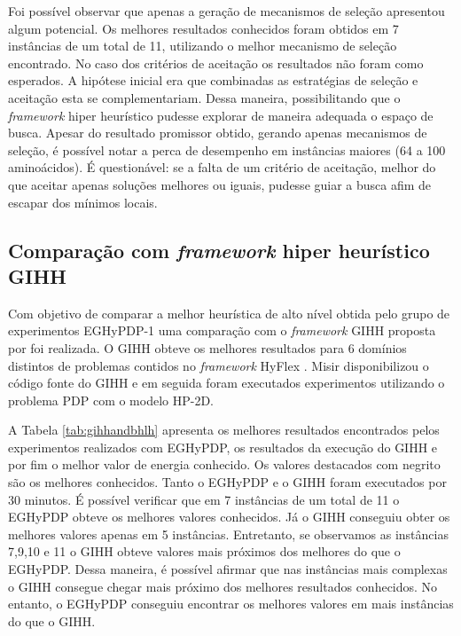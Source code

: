 	Foi possível observar que apenas a geração de mecanismos de seleção apresentou algum potencial. Os melhores resultados conhecidos foram obtidos em 7 instâncias de um total de 11, utilizando o melhor mecanismo de seleção encontrado. No caso dos critérios de aceitação os resultados não foram como esperados. A hipótese inicial era que combinadas as estratégias de seleção e aceitação esta se complementariam. Dessa maneira, possibilitando que o \textit{framework} hiper heurístico pudesse explorar de maneira adequada o espaço de busca. Apesar do resultado promissor obtido, gerando apenas mecanismos de seleção, é possível notar a perca de desempenho em instâncias maiores (64 a 100 aminoácidos). É questionável: se a falta de um critério de aceitação, melhor do que aceitar apenas soluções melhores ou iguais, pudesse guiar a busca afim de escapar dos mínimos locais. 

	
	
	\subsection{Comparação com \textit{framework} hiper heurístico GIHH}
	
	Com objetivo de comparar a melhor heurística de alto nível obtida pelo grupo de experimentos EGHyPDP-1 uma comparação com o \textit{framework} GIHH proposta por \cite{misir2012intelligent} foi realizada. O GIHH obteve os melhores resultados para 6  domínios distintos de problemas contidos no \textit{framework} HyFlex \cite{ochoa2012hyflex}. Misir disponibilizou o código fonte do GIHH e em seguida foram executados experimentos utilizando o problema PDP com o modelo HP-2D.
	
	A Tabela \ref{tab:gihhandbhlh} apresenta os melhores resultados encontrados pelos experimentos realizados com EGHyPDP, os resultados da execução do GIHH e por fim o melhor valor de energia conhecido. Os valores destacados com negrito são os melhores conhecidos. Tanto o EGHyPDP e o GIHH foram executados por 30 minutos. É possível verificar que em 7 instâncias de um total de 11 o EGHyPDP obteve os melhores valores conhecidos. Já o GIHH conseguiu obter os melhores valores apenas em 5 instâncias. Entretanto, se observamos as instâncias 7,9,10 e 11 o GIHH obteve valores mais próximos dos melhores do que o EGHyPDP. Dessa maneira, é possível afirmar que nas instâncias mais complexas o GIHH consegue chegar mais próximo dos melhores resultados conhecidos. No entanto, o EGHyPDP conseguiu encontrar os melhores valores em mais instâncias do que o GIHH. 
	
